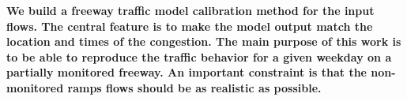 \textbf{We build a freeway traffic model calibration method for the input flows. The central feature is to make the model output match the location and times of the congestion. The main purpose of this work is to be able to reproduce the traffic behavior for a given weekday on a partially monitored freeway. An important constraint is that the non-monitored ramps flows should be as realistic as possible.}